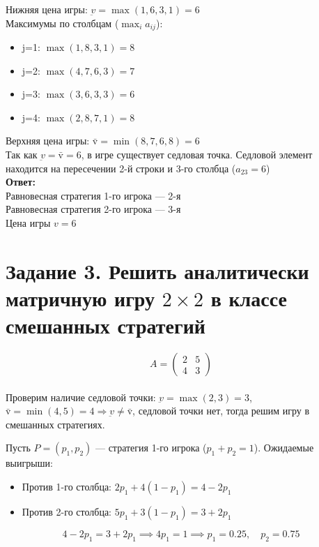 \documentclass[a4paper,12pt]{article}
\begin{document}
Нижняя цена игры: $\underbar{v} = \max(1, 6, 3, 1) = 6$ \\

Максимумы по столбцам ($\max_i a_{ij}$):
\begin{itemize}
    \item j=1: $\max(1, 8, 3, 1) = 8$
    \item j=2: $\max(4, 7, 6, 3) = 7$
    \item j=3: $\max(3, 6, 3, 3) = 6$
    \item j=4: $\max(2, 8, 7, 1) = 8$
\end{itemize}

Верхняя цена игры: $\bar{\text{v}} = \min(8, 7, 6, 8) = 6$ \\

Так как $\underbar{v} = \bar{\text{v}} = 6$, в игре существует седловая точка.
Седловой элемент находится на пересечении 2-й строки и 3-го столбца ($a_{23} = 6$) \\

\textbf{Ответ:}\\
Равновесная стратегия 1-го игрока — 2-я \\
Равновесная стратегия 2-го игрока — 3-я \\
Цена игры $v = 6$


\newpage


\section*{Задание 3. Решить аналитически матричную игру $2\times2$ в классе смешанных стратегий}
$$A = \begin{pmatrix} 2 & 5 \\ 4 & 3 \end{pmatrix}$$ \\

Проверим наличие седловой точки: $\underbar{v} = \max(2, 3) = 3$, $\bar{\text{v}} = \min(4, 5) = 4 \Rightarrow \underbar{v} \neq \bar{\text{v}}$, седловой точки нет, тогда решим игру в смешанных стратегиях.

Пусть $P = (p_1, p_2)$ — стратегия 1-го игрока ($p_1 + p_2 = 1$). Ожидаемые выигрыши:
\begin{itemize}
    \item Против 1-го столбца: $2p_1 + 4(1 - p_1) = 4 - 2p_1$
    \item Против 2-го столбца: $5p_1 + 3(1 - p_1) = 3 + 2p_1$
\end{itemize}
$$4 - 2p_1 = 3 + 2p_1 \implies 4p_1 = 1 \implies p_1 = 0.25, \quad p_2 = 0.75$$
\end{document}
